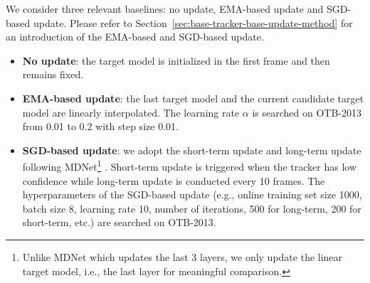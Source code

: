 \documentclass[journal]{IEEEtran}
\begin{document}
\begin{table}[]
	\centering
	\caption{Comparisons with three representative baselines: no update, EMA-based update and SGD-based update. The AUC and EAO metric (higher is better) are reported for OTB and VOT, respectively. For OTB only, the feature extractors are trained with both color and grayscale images. \label{table:baseline-comparison}}
\end{table}

We consider three relevant baselines: no update, EMA-based update and SGD-based update. Please refer to Section~\ref{sec:base-tracker-base-update-method} for an introduction of the EMA-based and SGD-based update. 
\begin{itemize}
	\item \textbf{No update}: the target model is initialized in the first frame and then remains fixed.
	\item \textbf{EMA-based update}: the last target model and the current candidate target model are linearly interpolated. The learning rate $\alpha$ is searched on OTB-2013 from 0.01 to 0.2 with step size 0.01.
	\item \textbf{SGD-based update}: we adopt the short-term update and long-term update following MDNet\footnote{Unlike MDNet which updates the last 3 layers, we only update the linear target model, i.e., the last layer for meaningful comparison.} \cite{Nam2016LearningMC}. Short-term update is triggered when the tracker has low confidence while long-term update is conducted every 10 frames. The hyperparameters of the SGD-based update (e.g., online training set size 1000, batch size 8, learning rate 10, number of iterations, 500 for long-term, 200 for short-term, etc.) are searched on OTB-2013.
\end{itemize}
\end{document}
